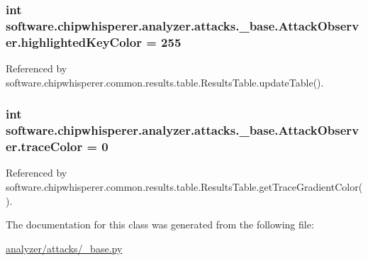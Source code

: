 \subsubsection[{highlighted\+Key\+Color}]{\setlength{\rightskip}{0pt plus 5cm}int software.\+chipwhisperer.\+analyzer.\+attacks.\+\_\+base.\+Attack\+Observer.\+highlighted\+Key\+Color = 255\hspace{0.3cm}{\ttfamily [static]}}\label{classsoftware_1_1chipwhisperer_1_1analyzer_1_1attacks_1_1__base_1_1AttackObserver_ab86a6c174ddb208b7513e02d7087fd31}


Referenced by software.\+chipwhisperer.\+common.\+results.\+table.\+Results\+Table.\+update\+Table().

\hypertarget{classsoftware_1_1chipwhisperer_1_1analyzer_1_1attacks_1_1__base_1_1AttackObserver_ad2992486563d90329cfad44a8965b67b}{}
\subsubsection[{trace\+Color}]{\setlength{\rightskip}{0pt plus 5cm}int software.\+chipwhisperer.\+analyzer.\+attacks.\+\_\+base.\+Attack\+Observer.\+trace\+Color = 0\hspace{0.3cm}{\ttfamily [static]}}\label{classsoftware_1_1chipwhisperer_1_1analyzer_1_1attacks_1_1__base_1_1AttackObserver_ad2992486563d90329cfad44a8965b67b}


Referenced by software.\+chipwhisperer.\+common.\+results.\+table.\+Results\+Table.\+get\+Trace\+Gradient\+Color().



The documentation for this class was generated from the following file\+:\begin{DoxyCompactItemize}
\item 
\hyperlink{analyzer_2attacks_2__base_8py}{analyzer/attacks/\+\_\+base.\+py}\end{DoxyCompactItemize}

